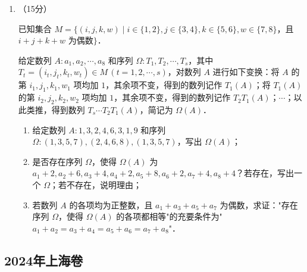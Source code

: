 \begin{description}
\begin{enumerate}[leftmargin=5pt]
        \item （15分）

        已知集合 $M=\{(i,j,k,w)\mid i\in\{1,2\},j\in\{3,4\},k\in\{5,6\},w\in\{7,8\}$，且 $i+j+k+w$ 为偶数$\}$．

        给定数列 $A:a_1,a_2,\cdots,a_8$ 和序列 $\Omega:T_1,T_2,\cdots,T_s$，其中 $T_t=(i_t,j_t,k_t,w_t)\in M\,(t=1,2,\cdots,s)$，对数列 $A$ 进行如下变换：将 $A$ 的第 $i_1,j_1,k_1,w_1$ 项均加 $1$，其余项不变，得到的数列记作 $T_1(A)$；将 $T_1(A)$ 的第 $i_2,j_2,k_2,w_2$ 项均加 $1$，其余项不变，得到的数列记作 $T_2T_1(A)$；$\cdots$；以此类推，得到数列 $T_s\cdots T_2T_1(A)$，简记为 $\Omega(A)$．

        \begin{enumerate}[label=(\arabic*)]
            \item 给定数列 $A:1,3,2,4,6,3,1,9$ 和序列 $\Omega:(1,3,5,7),(2,4,6,8),(1,3,5,7)$，写出 $\Omega(A)$；
            \item 是否存在序列 $\Omega$，使得 $\Omega(A)$ 为 $a_1+2,a_2+6,a_3+4,a_4+2,a_5+8,a_6+2,a_7+4,a_8+4$？若存在，写出一个 $\Omega$；若不存在，说明理由；
            \item 若数列 $A$ 的各项均为正整数，且 $a_1+a_3+a_5+a_7$ 为偶数，求证："存在序列 $\Omega$，使得 $\Omega(A)$ 的各项都相等"的充要条件为"$a_1+a_2=a_3+a_4=a_5+a_6=a_7+a_8$"．
        \end{enumerate}
    \end{enumerate}
\end{description}
\clearpage


\subsection{2024年上海卷}\label{gk:2024年上海卷}

